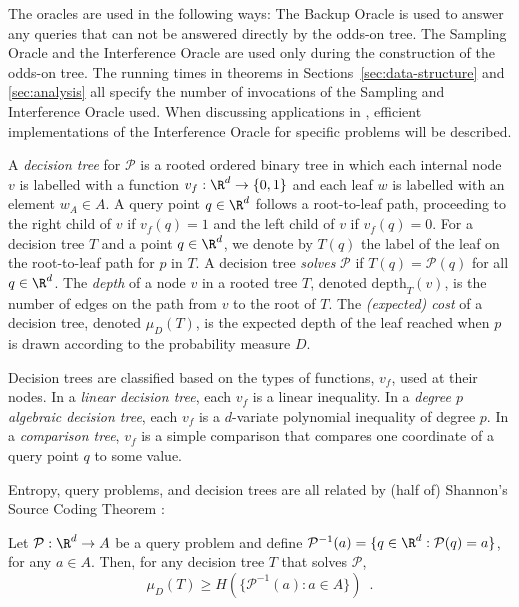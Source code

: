 \documentclass{patmorin}
\newcommand{\depth}{\mathrm{depth}}
\begin{document}
The oracles are used in the following ways:  The Backup Oracle is used to
answer any queries that can not be answered directly by the odds-on tree.
The Sampling Oracle and the Interference Oracle are used only during
the construction of the odds-on tree. The running times in theorems in
Sections~\ref{sec:data-structure} and \ref{sec:analysis} all specify
the number of invocations of the Sampling and Interference Oracle
used. When discussing applications in , efficient
implementations of the Interference Oracle for specific problems will
be described.

A \emph{decision tree} for $\mathcal{P}$ is a rooted ordered binary
tree in which each internal node $v$ is labelled with a function
$v_f:\R^d\rightarrow\{0,1\}$ and each leaf $w$ is labelled with an element
$w_A\in A$.  A query point $q\in\R^d$ follows a root-to-leaf path,
proceeding to the right child of $v$ if $v_f(q)=1$ and the left
child of $v$ if $v_f(q)=0$.  For a decision tree $T$ and a point
$q\in\R^d$, we denote by $T(q)$ the label of the leaf on the root-to-leaf
path for $p$ in $T$.  A decision tree \emph{solves} $\mathcal{P}$ if
$T(q)=\mathcal{P}(q)$ for all $q\in\R^d$. The \emph{depth} of a node $v$
in a rooted tree $T$, denoted $\depth_T(v)$, is the number of edges
on the path from $v$ to the root of $T$.  The \emph{(expected) cost}
of a decision tree, denoted $\mu_D(T)$, is the expected depth of the
leaf reached when $p$ is drawn according to the probability measure $D$.

Decision trees are classified based on the types of functions, $v_f$,
used at their nodes.  In a \emph{linear decision tree}, each $v_f$ is
a linear inequality.  In a \emph{degree $p$ algebraic decision tree},
each $v_f$ is a $d$-variate polynomial inequality of degree $p$.  In a
\emph{comparison tree}, $v_f$ is a simple comparison that compares one
coordinate of a query point $q$ to some value.

Entropy, query problems, and decision trees are all related by (half of)
Shannon's Source Coding Theorem \cite{s48}:

\begin{thm}[Shannon 1948]
  Let $\mathcal{P}:\R^d\rightarrow A$ be a query problem and define
  $\mathcal{P}^{-1}(a)=\{q\in\R^d:\mathcal{P}(q)=a\}$, for any $a\in
  A$. Then, for any decision tree $T$ that solves $\mathcal{P}$,
  \[
    \mu_D(T) \ge H(\{\mathcal{P}^{-1}(a): a\in A\}) \enspace .
  \]
\end{thm}
\end{document}
